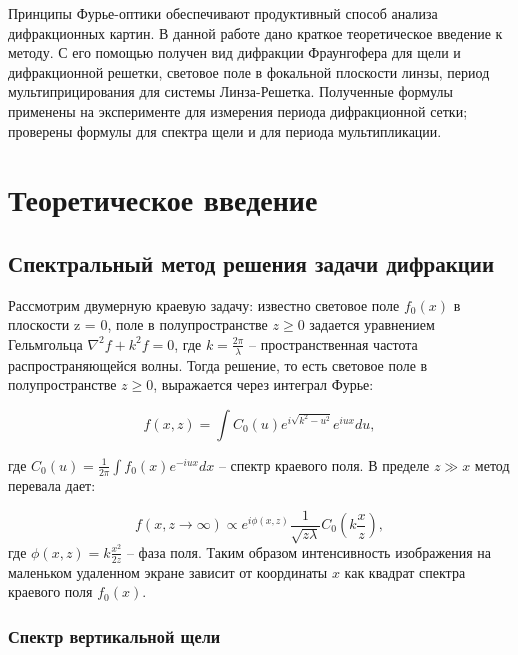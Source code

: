 \documentclass[a4paper,12pt]{article} %
\begin{document}

\begin{center}
    Принципы Фурье-оптики обеспечивают продуктивный способ анализа дифракционных картин. В данной работе дано краткое теоретическое введение к методу. С его помощью получен вид дифракции Фраунгофера для щели и дифракционной решетки, световое поле в фокальной плоскости линзы, период мультиприцирования для системы Линза-Решетка. Полученные формулы применены на эксперименте для измерения периода дифракционной сетки; проверены формулы для спектра щели и для периода мультипликации. 
\end{center}

\tableofcontents

\newpage

\section{Теоретическое введение}
\subsection{Спектральный метод решения задачи дифракции}
\label{sec:spectr}
Рассмотрим двумерную краевую задачу: известно световое поле $f_0(x)$ в плоскости z = 0, поле в полупространстве $z \ge 0$ задается уравнением Гельмгольца $\nabla^2 f + k^2 f = 0$, где $k = \frac{2\pi}{\lambda}$ -- пространственная частота распространяющейся волны. Тогда решение, то есть световое поле в полупространстве $z \ge 0$, выражается через интеграл Фурье:

\begin{equation}
    f(x, z) = \int C_0(u) e^{i\sqrt{k^2 - u^2}} e^{i u x} du , 
\end{equation}

где $C_0(u) = \frac{1}{2\pi} \int f_0(x) e^{-i u x} dx$ -- спектр краевого поля. В пределе $z \gg x$ метод перевала дает:

\begin{equation}
    f(x, z \to\infty) \propto e^{i \phi(x, z)} \frac{1}{\sqrt{z \lambda}} C_0\left(k\frac{x}{z}\right) , 
    \label{eq:spectrum}
\end{equation}
где $\phi(x, z) = k\frac{x^2}{2z}$ -- фаза поля. Таким образом интенсивность изображения на маленьком удаленном экране зависит от координаты $x$ как квадрат спектра краевого поля $f_0(x)$.

\subsubsection{Спектр вертикальной щели}
\end{document}
